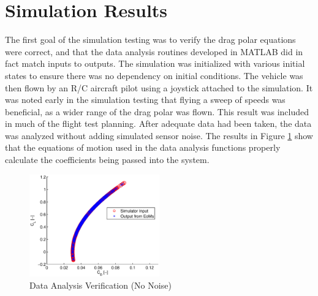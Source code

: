 \section{Simulation Results}
The first goal of the simulation testing was to verify the drag polar equations were correct, and that the data analysis routines developed in MATLAB did in fact match inputs to outputs. The simulation was initialized with various initial states to ensure there was no dependency on initial conditions. The vehicle was then flown by an R/C aircraft pilot using a joystick attached to the simulation. It was noted early in the simulation testing that flying a sweep of speeds was beneficial, as a wider range of the drag polar was flown. This result was included in much of the flight test planning. After adequate data had been taken, the data was analyzed without adding simulated sensor noise. The results in Figure \ref{dragPolarNoNoise} show that the equations of motion used in the data analysis functions properly calculate the coefficients being passed into the system.

\begin{figure}[H]
  \centering
  
    \includegraphics[width=0.5\textwidth]{figures/dragPolarNoNoise.eps}
    \caption{Data Analysis Verification (No Noise)}
        \label{dragPolarNoNoise}
\end{figure}

